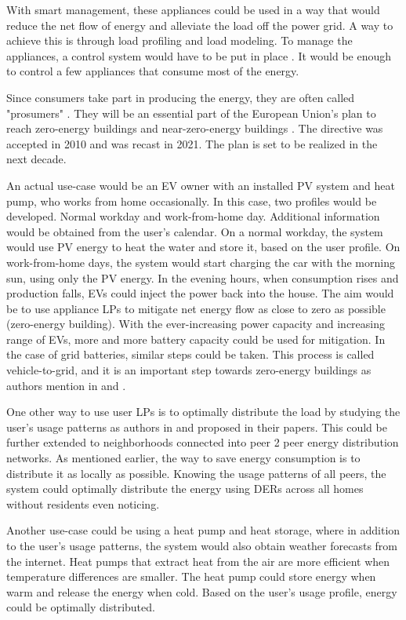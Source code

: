 With smart management, these appliances could be used in a way that would reduce the net flow of energy and alleviate the load off the power grid.
A way to achieve this is through load profiling and load modeling. 
To manage the appliances, a control system would have to be put in place \cite{DirectLoadControll2021}.
It would be enough to control a few appliances that consume most of the energy. 

Since consumers take part in producing the energy, they are often called "prosumers" \cite{Prosumer2016}.
They will be an essential part of the European Union's plan to reach zero-energy buildings
and near-zero-energy buildings \cite{eu2021}. The directive was accepted in 2010 and was recast in 2021.
The plan is set to be realized in the next decade.

An actual use-case would be an EV owner with an installed PV system and heat pump, who works from home occasionally.
In this case, two profiles would be developed. Normal workday and work-from-home day.
Additional information would be obtained from the user's calendar. 
On a normal workday, the system would use PV energy to heat the water and store it, based on the user profile.
On work-from-home days, the system would start charging the car with the morning sun, using only the PV energy. 
In the evening hours, when consumption rises and production falls, EVs could inject the power back into the house. 
The aim would be to use appliance LPs to mitigate net energy flow as close to zero as possible (zero-energy building).
With the ever-increasing power capacity and increasing range of EVs, more and more battery capacity could be used for mitigation. 
In the case of grid batteries, similar steps could be taken.
This process is called vehicle-to-grid, and it is an important step towards zero-energy buildings as authors mention in \cite{EV2018} and \cite{EV2020}.

One other way to use user LPs is to optimally distribute the load by studying the user's usage patterns as authors in \cite{Chuan2014} and \cite{shift2015} proposed in their papers. 
This could be further extended to neighborhoods connected into peer 2 peer energy distribution networks.
As mentioned earlier, the way to save energy consumption is to distribute it as locally as possible. 
Knowing the usage patterns of all peers, the system could optimally distribute the energy using DERs across all homes without residents even noticing.

Another use-case could be using a heat pump and heat storage,
where in addition to the user's usage patterns, the system would also obtain weather forecasts from the internet.
Heat pumps that extract heat from the air are more efficient when temperature differences are smaller. 
The heat pump could store energy when warm and release the energy when cold.
Based on the user's usage profile, energy could be optimally distributed.

